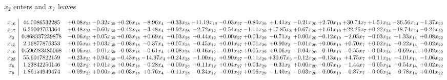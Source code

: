 \documentclass[9pt]{article}
\begin{document}
 $ x_{2} $ enters and $ x_{7} $ leaves 

 \[\begin{array}{c| c c@{\hskip 2pt} c@{\hskip 2pt} c@{\hskip 2pt} c@{\hskip 2pt} c@{\hskip 2pt} c@{\hskip 2pt} c@{\hskip 2pt} c@{\hskip 2pt} c@{\hskip 2pt} c@{\hskip 2pt} c@{\hskip 2pt} c@{\hskip 2pt} c@{\hskip 2pt} c@{\hskip 2pt} c@{\hskip 2pt} }
 x_{16}   &  44.0086532285 & +  0.08 x_{25} & -0.32 x_{30} & +  0.26 x_{18} & -8.96 x_{4} & -0.33 x_{28} & -11.19 x_{12} & -0.03 x_{27} & -0.80 x_{29} & +  1.41 x_{3} & -0.21 x_{20} & +  2.70 x_{19} & + 30.74 x_{7} & +  1.51 x_{24} & -36.56 x_{14} & -1.37 x_{22}\\
 x_{17}   &  6.39002703364 & +  0.48 x_{25} & -0.60 x_{30} & -0.42 x_{18} & -3.48 x_{4} & +  0.92 x_{28} & -2.72 x_{12} & -0.54 x_{27} & -1.11 x_{29} & + 17.85 x_{3} & +  0.67 x_{20} & +  1.61 x_{19} & + 22.26 x_{7} & +  0.22 x_{24} & -18.74 x_{14} & -0.24 x_{22}\\
 x_{2}   &  0.868337239878 & -0.06 x_{25} & +  0.05 x_{30} & +  0.03 x_{18} & +  0.69 x_{4} & -0.03 x_{28} & +  0.44 x_{12} & +  0.00 x_{27} & +  0.03 x_{29} & -0.71 x_{3} & +  0.00 x_{20} & -0.12 x_{19} & -2.03 x_{7} & -0.03 x_{24} & +  1.33 x_{14} & +  0.08 x_{22}\\
 x_{15}   &  2.16877876353 & +  0.05 x_{25} & +  0.03 x_{30} & -0.03 x_{18} & -0.37 x_{4} & +  0.07 x_{28} & -0.45 x_{12} & +  0.01 x_{27} & +  0.01 x_{29} & +  0.90 x_{3} & -0.01 x_{20} & +  0.06 x_{19} & +  0.70 x_{7} & +  0.02 x_{24} & -0.22 x_{14} & -0.02 x_{22}\\
 x_{10}   &  0.596283485068 & +  0.06 x_{25} & -0.01 x_{30} & -0.03 x_{18} & -0.61 x_{4} & +  0.08 x_{28} & +  0.46 x_{12} & -0.01 x_{27} & +  0.05 x_{29} & +  0.06 x_{3} & -0.04 x_{20} & -0.10 x_{19} & -0.55 x_{7} & -0.04 x_{24} & +  0.69 x_{14} & +  0.02 x_{22}\\
 x_{23}   &  55.6017822159 & -0.23 x_{25} & +  0.94 x_{30} & -0.43 x_{18} & -14.97 x_{4} & +  0.24 x_{28} & -1.00 x_{12} & +  0.90 x_{27} & -0.11 x_{29} & + 30.67 x_{3} & -0.12 x_{20} & -0.13 x_{19} & +  4.75 x_{7} & +  0.11 x_{24} & -4.01 x_{14} & -1.06 x_{22}\\
 x_{6}   &  1.23842250146 & -0.02 x_{25} & +  0.01 x_{30} & +  0.04 x_{18} & -0.28 x_{4} & -0.00 x_{28} & +  0.11 x_{12} & +  0.04 x_{27} & +  0.03 x_{29} & -0.31 x_{3} & +  0.00 x_{20} & -0.07 x_{19} & -1.44 x_{7} & -0.05 x_{24} & +  0.54 x_{14} & +  0.02 x_{22}\\
 x_{9}   &  1.86154949474 & -0.09 x_{25} & +  0.00 x_{30} & +  0.03 x_{18} & +  0.76 x_{4} & -0.11 x_{28} & -0.34 x_{12} & -0.01 x_{27} & +  0.06 x_{29} & -1.40 x_{3} & -0.03 x_{20} & -0.06 x_{19} & -0.87 x_{7} & -0.06 x_{24} & +  0.78 x_{14} & +  0.01 x_{22}\\

\end{array}\]
\end{document}
